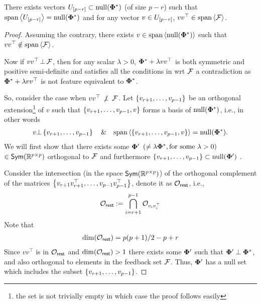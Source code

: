 \begin{lemma}\label{lem: unique}
    There exists vectors $U_{\bracket{p-r}} \subset \nul{\pphi^*}$ (of size $p - r $) such that $\text{span} \inner{U_{\bracket{p-r}} } = \nul{\pphi^*}$ and 
        for any vector $v \in U_{\bracket{p-r}}$, $vv^{\top} \in \text{span} \inner{\cF}$.
\end{lemma}
\begin{proof}
    Assuming the contrary, there exists $v \in \text{span} \inner{\nul{\pphi^*}}$ such that $vv^{\top} \notin \text{span} \inner{\cF}$.

    Now if $vv^{\top}\, \bot\, \cF$, then for any scalar $\lambda > 0$, $\pphi^* + \lambda vv^{\top}$ is both symmetric and positive semi-definite and satisfies all the conditions in  wrt $\cF$ a contradiction as $\pphi^* + \lambda vv^{\top}$ is not feature equivalent to $\pphi^*$. 
    
    So, consider the case when $vv^{\top}\, \not\perp\, \cF$. Let $\curlybracket{v_{r+1},\ldots,v_{p-1}}$ be an orthogonal extension\footnote{the set is not trivially empty in which case the proof follows easily} of $v$ such that $\curlybracket{v_{r+1},\ldots,v_{p-1}, v}$ forms a basis of $\nul{\pphi^*}$, i.e., in other words 
    \begin{align*}
    v \bot \curlybracket{v_{r+1},\ldots,v_{p-1}}\quad \&\quad \text{span} \inner{\curlybracket{v_{r+1},\ldots,v_{p-1}, v}} = \nul{\pphi^*}.
    \end{align*}
    We will first show that there exists some $\pphi'$ $(\not = \lambda\pphi^*, \text{for some } \lambda > 0)$ $\in \symm$ orthogonal to $\cF$ and furthermore $\curlybracket{v_{r+1},\ldots,v_{p-1}} \subset \nul{\pphi'}$ . 
    
    
    Consider the intersection (in the space $\symm$) of the orthogonal complement of the matrices $\curlybracket{v_{r+1}v_{r+1}^{\top},\ldots,v_{p-1}v_{p-1}^{\top}}$, denote it as $\mathcal{O}_{\sf{rest}}$, i.e.,
    \begin{align*}
        \mathcal{O}_{\sf{rest}} := \bigcap_{i = r+1}^{p-1} \mathcal{O}_{v_iv_i^{\top}} 
    \end{align*}
    Note that %
    \begin{align*}
        \dim(\mathcal{O}_{\sf{rest}}) = p(p+1)/2 - p+ r
    \end{align*}
    Since $vv^{\top}$ is in $\mathcal{O}_{\sf{rest}}$ and $\dim(\mathcal{O}_{\sf{rest}}) > 1$ there exists some $\pphi'$ such that $\pphi' \perp \pphi^*$, and also orthogonal to elements in the feedback set $\cF$. Thus, $\pphi'$ has a null set which includes the subset $\curlybracket{v_{r+1},\ldots,v_{p-1}}$. 
    

\end{proof}
